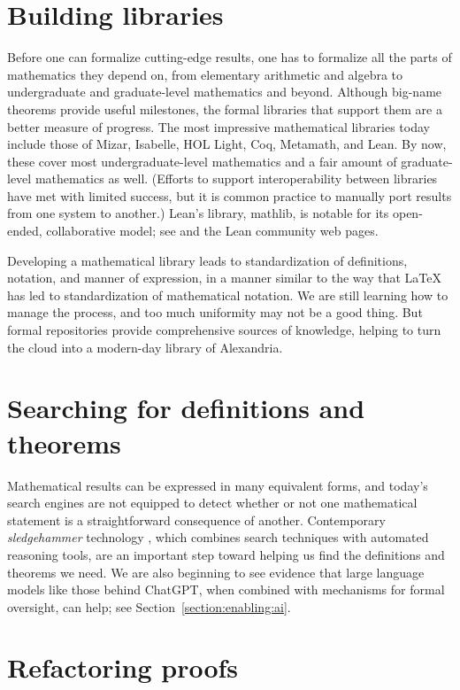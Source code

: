 \documentclass{amsart}
\theoremstyle{definition}
\theoremstyle{remark}
\numberwithin{equation}{section}
\begin{document}
\section{Building libraries}

Before one can formalize cutting-edge results, one has to formalize all the parts of mathematics they depend on, from elementary arithmetic and algebra to undergraduate and graduate-level mathematics and beyond. Although big-name theorems provide useful milestones, the formal libraries that support them are a better measure of progress. The most impressive mathematical libraries today include those of Mizar, Isabelle, HOL Light, Coq, Metamath, and Lean. By now, these cover most undergraduate-level mathematics and a fair amount of graduate-level mathematics as well. (Efforts to support interoperability between libraries have met with limited success, but it is common practice to manually port results from one system to another.) Lean's library, mathlib, is notable for its open-ended, collaborative model; see \cite{mathlib:20} and the Lean community web pages.

Developing a mathematical library leads to standardization of definitions, notation, and manner of expression, in a manner similar to the way that \LaTeX{} has led to standardization of mathematical notation. We are still learning how to manage the process, and too much uniformity may not be a good thing. But formal repositories provide comprehensive sources of knowledge, helping to turn the cloud into a modern-day library of Alexandria.


\section{Searching for definitions and theorems}

Mathematical results can be expressed in many equivalent forms, and today's search engines are not equipped to detect whether or not one mathematical statement is a straightforward consequence of another. Contemporary \emph{sledgehammer} technology \cite{desharnais:et:al:22}, which combines search techniques with automated reasoning tools, are an important step toward helping us find the definitions and theorems we need. We are also beginning to see evidence that large language models like those behind ChatGPT, when combined with mechanisms for formal oversight, can help; see Section~\ref{section:enabling:ai}.


\section{Refactoring proofs}
\end{document}
